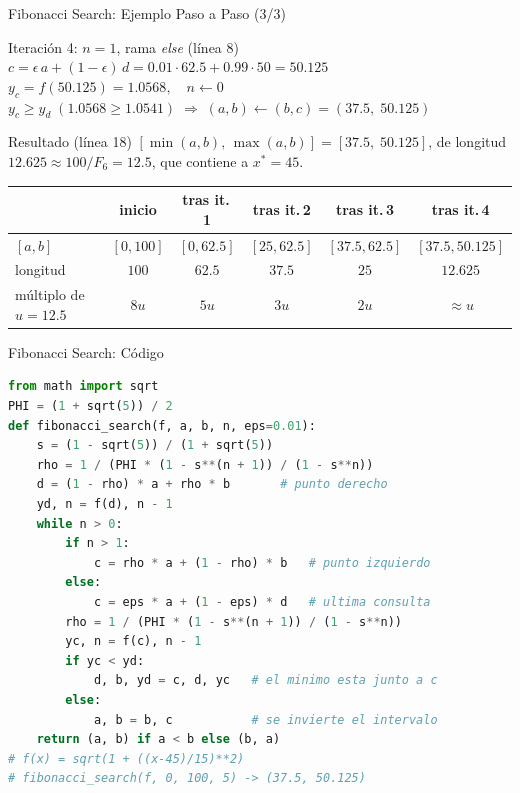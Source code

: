 \begin{frame}{Fibonacci Search: Ejemplo Paso a Paso (3/3)}
    \scriptsize
    \begin{block}{Iteración 4: $n=1$, rama \textit{else} (línea 8)}
        $c=\epsilon\, a+(1-\epsilon)\, d=0.01\cdot 62.5+0.99\cdot 50=50.125$\\[2pt]
        $y_c=f(50.125)=1.0568,\quad n\gets 0$\\[2pt]
        $y_c\ge y_d\;(1.0568\ge 1.0541) \;\Rightarrow\; (a,b)\gets(b,c)=(37.5,\;50.125)$
    \end{block}

    \begin{exampleblock}{Resultado (línea 18)}
        $[\min(a,b),\,\max(a,b)]=[37.5,\;50.125]$, de longitud $12.625\approx 100/F_6=12.5$,
        que contiene a $x^{*}=45$.
    \end{exampleblock}

    \begin{center}
    \begin{tabular}{l c c c c c}
        \toprule
        & inicio & tras it.\,1 & tras it.\,2 & tras it.\,3 & tras it.\,4 \\
        \midrule
        $[a,b]$  & $[0,100]$ & $[0,62.5]$ & $[25,62.5]$ & $[37.5,62.5]$ & $[37.5,50.125]$ \\
        longitud & $100$ & $62.5$ & $37.5$ & $25$ & $12.625$ \\
        múltiplo de $u=12.5$ & $8u$ & $5u$ & $3u$ & $2u$ & $\approx u$ \\
        \bottomrule
    \end{tabular}
    \end{center}
\end{frame}

\begin{frame}[fragile]{Fibonacci Search: Código}
\begin{lstlisting}[language=Python]
from math import sqrt
PHI = (1 + sqrt(5)) / 2
def fibonacci_search(f, a, b, n, eps=0.01):
    s = (1 - sqrt(5)) / (1 + sqrt(5))
    rho = 1 / (PHI * (1 - s**(n + 1)) / (1 - s**n))
    d = (1 - rho) * a + rho * b       # punto derecho
    yd, n = f(d), n - 1
    while n > 0:
        if n > 1:
            c = rho * a + (1 - rho) * b   # punto izquierdo
        else:
            c = eps * a + (1 - eps) * d   # ultima consulta
        rho = 1 / (PHI * (1 - s**(n + 1)) / (1 - s**n))
        yc, n = f(c), n - 1
        if yc < yd:
            d, b, yd = c, d, yc   # el minimo esta junto a c
        else:
            a, b = b, c           # se invierte el intervalo
    return (a, b) if a < b else (b, a)
# f(x) = sqrt(1 + ((x-45)/15)**2)
# fibonacci_search(f, 0, 100, 5) -> (37.5, 50.125)
\end{lstlisting}
\end{frame}

